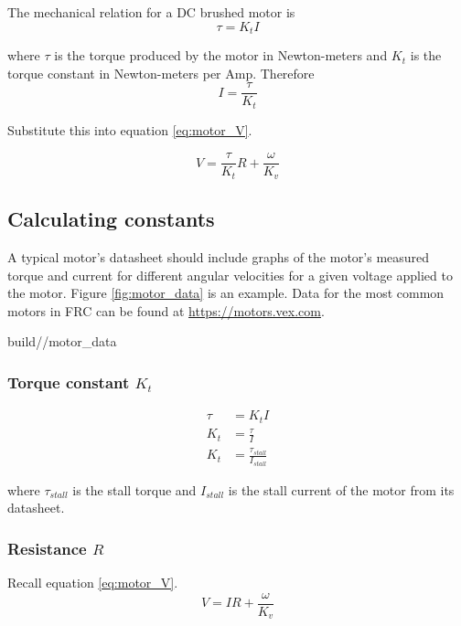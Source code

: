The mechanical relation for a DC brushed motor is
\begin{equation}
  \tau = K_t I
\end{equation}

where $\tau$ is the torque produced by the motor in Newton-meters and $K_t$ is
the torque constant in Newton-meters per Amp. Therefore
\begin{equation*}
  I = \frac{\tau}{K_t}
\end{equation*}

Substitute this into equation \eqref{eq:motor_V}.

\begin{equation}
  V = \frac{\tau}{K_t} R + \frac{\omega}{K_v} \label{eq:motor_tau_V}
\end{equation}

\subsection{Calculating constants}

A typical motor's datasheet should include graphs of the motor's measured torque
and current for different angular velocities for a given voltage applied to the
motor. Figure \ref{fig:motor_data} is an example. Data for the most common
motors in FRC can be found at \url{https://motors.vex.com}.
\begin{svg}{build/\chapterpath/motor_data}
  \caption{Example motor datasheet for 775pro}
  \label{fig:motor_data}
\end{svg}

\subsubsection{Torque constant $K_t$}
\begin{align}
  \tau &= K_t I \nonumber \\
  K_t &= \frac{\tau}{I} \nonumber \\
  K_t &= \frac{\tau_{stall}}{I_{stall}}
\end{align}

where $\tau_{stall}$ is the stall torque and $I_{stall}$ is the stall current of
the motor from its datasheet.

\subsubsection{Resistance $R$}

Recall equation \eqref{eq:motor_V}.
\begin{equation*}
  V = IR + \frac{\omega}{K_v}
\end{equation*}

